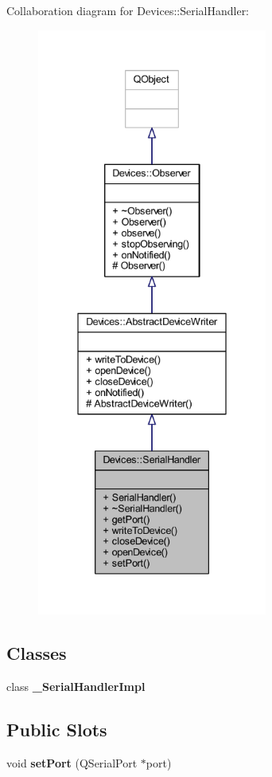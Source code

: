 Collaboration diagram for Devices\+:\+:Serial\+Handler\+:\nopagebreak
\begin{figure}[H]
\begin{center}
\leavevmode
\includegraphics[height=550pt]{df/d83/class_devices_1_1_serial_handler__coll__graph}
\end{center}
\end{figure}
\subsection*{Classes}
\begin{DoxyCompactItemize}
\item 
class {\bfseries \+\_\+\+Serial\+Handler\+Impl}
\end{DoxyCompactItemize}
\subsection*{Public Slots}
\begin{DoxyCompactItemize}
\item 
\mbox{\label{class_devices_1_1_serial_handler_aefd1562bc2b86e3ee7bac6df61d1b9b8}} 
void {\bfseries set\+Port} (Q\+Serial\+Port $\ast$port)
\end{DoxyCompactItemize}
